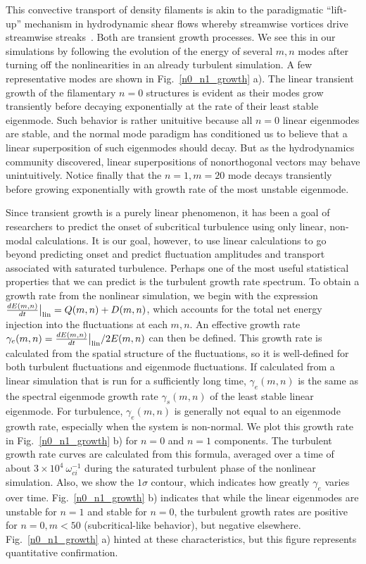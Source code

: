 \documentclass[letter,scriptaddress,twocolumn, prl,showkeys]{revtex4}
\newcommand{\diff}[2]{\frac{d#1}{d#2}}
\begin{document}
This convective transport of density filaments is akin to the paradigmatic ``lift-up'' mechanism in hydrodynamic shear flows whereby streamwise vortices drive streamwise 
streaks~\cite{trefethen1993,krommes1999}.
Both are transient growth processes. We see this in our simulations by following the evolution of the energy of several $m,n$ modes after turning off the nonlinearities in an already
turbulent simulation. A few representative modes are shown in Fig.~\ref{n0_n1_growth} a). The linear transient growth of the filamentary $n=0$ structures is evident as their modes 
grow transiently before decaying exponentially at the rate of their least stable eigenmode. Such behavior is rather unituitive because all $n=0$ linear eigenmodes are stable, 
and the normal mode paradigm has conditioned us to believe that a linear superposition of such eigenmodes should decay. But as the hydrodynamics community discovered, linear
superpositions of nonorthogonal vectors may behave unintuitively.
Notice finally that the $n=1,m=20$ mode decays transiently before growing exponentially with growth rate of the most unstable eigenmode.

Since transient growth is a purely linear phenomenon, it has been a goal of researchers to predict the onset of subcritical turbulence using
only linear, non-modal calculations. It is our goal, however, to use linear calculations to go beyond predicting onset and predict fluctuation amplitudes and transport associated with saturated turbulence.
Perhaps one of the most useful statistical properties that we can predict is the turbulent growth rate spectrum.
To obtain a growth rate from the nonlinear simulation, we begin with the expression $\diff{E(m,n)}{t}\big|_{\rm{lin}} = Q(m,n) + D(m,n)$, 
which accounts for the total net energy injection into the fluctuations at each $m,n$. 
An effective growth rate $\gamma_e(m,n) = \diff{E(m,n)}{t}\big|_{\rm{lin}}/ 2 E(m,n)$ can then be defined. 
This growth rate is calculated from the spatial structure of the fluctuations, so it is well-defined for both turbulent fluctuations and eigenmode fluctuations. If calculated
from a linear simulation that is run for a sufficiently long time, $\gamma_e(m,n)$ is the same as the spectral eigenmode growth rate $\gamma_s(m,n)$ of the least stable linear eigenmode.
For turbulence, $\gamma_e(m,n)$ is generally not equal to an eigenmode growth rate, especially when the system is non-normal.
We plot this growth rate in Fig.~\ref{n0_n1_growth} b) for $n=0$ and $n=1$ components. The turbulent growth rate curves are calculated from this formula, 
averaged over a time of about $3 \times 10^{4} \ \omega_{ci}^{-1}$ during the saturated turbulent phase of the nonlinear simulation.
Also, we show the $1 \sigma$ contour, which indicates how greatly $\gamma_e$ varies over time.
Fig.~\ref{n0_n1_growth} b) indicates that while the linear eigenmodes are unstable for $n=1$ and stable for $n=0$,
the turbulent growth rates are positive for $n=0, m<50$ (subcritical-like behavior), but negative elsewhere. 
Fig.~\ref{n0_n1_growth} a) hinted at these characteristics, but this figure represents quantitative confirmation.
\end{document}
